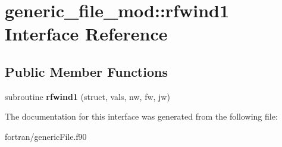 \hypertarget{interfacegeneric__file__mod_1_1rfwind1}{}\section{generic\+\_\+file\+\_\+mod\+:\+:rfwind1 Interface Reference}
\label{interfacegeneric__file__mod_1_1rfwind1}
\subsection*{Public Member Functions}
\begin{DoxyCompactItemize}
\item 
\mbox{\label{interfacegeneric__file__mod_1_1rfwind1_ae2385d883afe37107c450232ba2b601d}} 
subroutine {\bfseries rfwind1} (struct, vals, nw, fw, jw)
\end{DoxyCompactItemize}


The documentation for this interface was generated from the following file\+:\begin{DoxyCompactItemize}
\item 
fortran/generic\+File.\+f90\end{DoxyCompactItemize}
